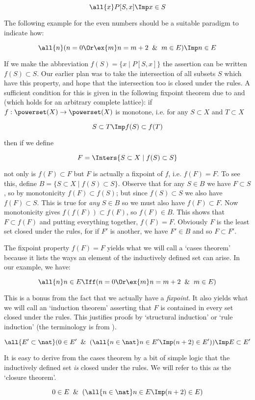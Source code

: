 $$ \all{x} P[S,x] \Imp x \in S $$

\noindent The following example for the even numbers should be a suitable
paradigm to indicate how:

$$\all{n} (n = 0 \Or \ex{m} n = m + 2 \And m \in E) \Imp n \in E $$

If we make the abbreviation $f(S) = \{x \mid P[S,x]\}$ the assertion can be
written $f(S) \subset S$. Our earlier plan was to take the intersection of all
subsets $S$ which have this property, and hope that the intersection too is
closed under the rules. A sufficient condition for this is given in the
following fixpoint theorem due to  and  (which
holds for an arbitrary complete lattice): if $f:\powerset(X) \to \powerset(X)$
is monotone, i.e. for any $S \subset X$ and $T \subset X$

$$ S \subset T \Imp f(S) \subset f(T) $$

\noindent then if we define

$$ F = \Inters \{ S \subset X \mid f(S) \subset S \} $$

\noindent not only is $f(F) \subset F$ but $F$ is actually a fixpoint of $f$,
i.e. $f(F) = F$. To see this, define $B = \{ S \subset X \mid f(S) \subset S
\}$. Observe that for any $S \in B$ we have $F \subset S$, so by monotonicity
$f(F) \subset f(S)$; but since $f(S) \subset S$ we also have $f(F) \subset S$.
This is true for {\em any} $S \in B$ so we must also have $f(F) \subset F$.
Now monotonicity gives $f(f(F)) \subset f(F)$, so $f(F) \in B$. This shows that
$F \subset f(F)$ and putting everything together, $f(F) = F$. Obviously $F$ is
the least set closed under the rules, for if $F'$ is another, we have $F' \in
B$ and so $F \subset F'$.

The fixpoint property $f(F) = F$ yields what we will call a `cases theorem'
because it lists the ways an element of the inductively defined set can arise.
In our example, we have:

$$\all{n} n \in E \Iff (n = 0 \Or \ex{m} n = m + 2 \And m \in E) $$

This is a bonus from the fact that we actually have a {\em fixpoint}. It also
yields what we will call an `induction theorem' asserting that $F$ is contained
in every set closed under the rules. This justifies proofs by `structural
induction' or `rule induction' (the terminology is from ).

$$ \all{E' \subset \nat} (0 \in E' \And (\all{n \in \nat} n \in E' \Imp (n + 2)
   \in E')) \Imp E \subset E' $$

It is easy to derive from the cases theorem by a bit of simple logic that the
inductively defined set {\em is} closed under the rules. We will refer to this
as the `closure theorem'.

$$ 0 \in E \And (\all{n \in \nat} n \in E \Imp (n + 2) \in E) $$

